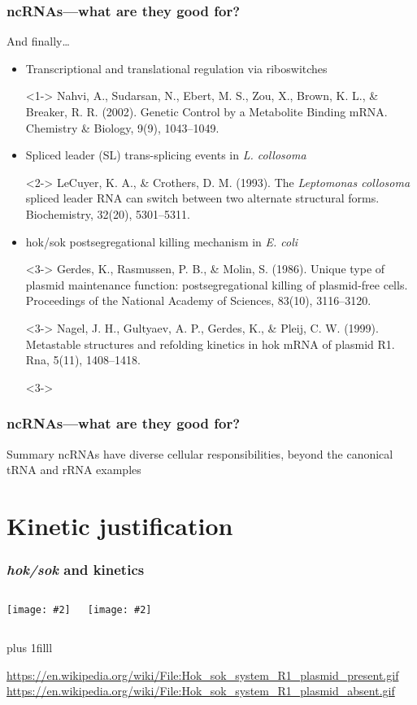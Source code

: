 \documentclass{beamer}
\newcommand{\slidefigure}[2][1]{\centering\texttt{[image: \#2]}}
\newcommand{\btVFill}{\vskip 0pt plus 1filll}
\begin{document}
\begin{frame}
	\frametitle{ncRNAs---what are they good for?}

	And finally\dots
	\begin{itemize}
		\item<1-> Transcriptional and translational regulation via riboswitches
		\item[]<1-> \scriptsize Nahvi, A., Sudarsan, N., Ebert, M. S., Zou, X., Brown, K. L., \& Breaker, R. R. (2002). Genetic Control by a Metabolite Binding mRNA. Chemistry \& Biology, 9(9), 1043--1049.
		\item<2-> Spliced leader (SL) trans-splicing events in {\em L. collosoma}
		\item[]<2-> \scriptsize LeCuyer, K. A., \& Crothers, D. M. (1993). The {\em Leptomonas collosoma} spliced leader RNA can switch between two alternate structural forms. Biochemistry, 32(20), 5301--5311.
		\item<3-> hok/sok postsegregational killing mechanism in {\em E. coli}
		\item[]<3-> \scriptsize Gerdes, K., Rasmussen, P. B., \& Molin, S. (1986). Unique type of plasmid maintenance function: postsegregational killing of plasmid-free cells. Proceedings of the National Academy of Sciences, 83(10), 3116--3120.
		\item[]<3-> \scriptsize Nagel, J. H., Gultyaev, A. P., Gerdes, K., \& Pleij, C. W. (1999). Metastable structures and refolding kinetics in hok mRNA of plasmid R1. Rna, 5(11), 1408--1418.
		\item[]<3->
	\end{itemize}
\end{frame}

\begin{frame}
	\frametitle{ncRNAs---what are they good for?}
	\begin{block}
		{Summary} ncRNAs have diverse cellular responsibilities, beyond the canonical tRNA and rRNA examples
	\end{block}
\end{frame}


\section{Kinetic justification}

\begin{frame}
	\frametitle{{\em hok/sok} and kinetics}
	\begin{columns}
		\slidefigure{r1present}

		\slidefigure{r1missing}
	\end{columns}

	\btVFill
	\begin{center}
		\tiny \color{litegray} \url{https://en.wikipedia.org/wiki/File:Hok_sok_system_R1_plasmid_present.gif} \\
		\url{https://en.wikipedia.org/wiki/File:Hok_sok_system_R1_plasmid_absent.gif}
	\end{center}
\end{frame}
\end{document}
